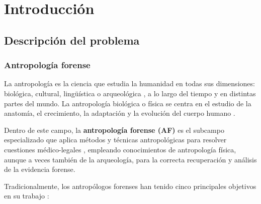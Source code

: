 
\chapter{Introducción}


\section{Descripción del problema}

\subsection{Antropología forense}

La antropología es la ciencia que estudia la humanidad en todas sus dimensiones: biológica, cultural, lingüística o
arqueológica \cite{AAA2022AnthropologyDefinition}, a lo largo del tiempo y en distintas partes del mundo. La antropología 
biológica o física se centra en el estudio de la anatomía, el crecimiento, la adaptación y la evolución del cuerpo humano 
\cite{nawrocki1996OutlineFA}. 

Dentro de este campo, la \textbf{antropología forense (AF)} es el subcampo especializado que aplica métodos y técnicas 
antropológicas para resolver cuestiones médico-legales \cite{nawrocki1996OutlineFA}, empleando conocimientos de 
antropología física, aunque a veces también de la arqueología, para la correcta recuperación y análisis de la evidencia 
forense.

Tradicionalmente, los antropólogos forenses han tenido cinco principales objetivos en su trabajo \cite{byers2023}:

